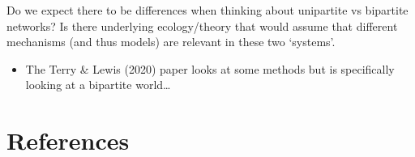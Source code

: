\documentclass[
]{article}
\providecommand{\tightlist}{%
  \setlength{\itemsep}{0pt}\setlength{\parskip}{0pt}}\usepackage{longtable,booktabs,array}
\begin{document}
Do we expect there to be differences when thinking about unipartite vs
bipartite networks? Is there underlying ecology/theory that would assume
that different mechanisms (and thus models) are relevant in these two
`systems'.

\begin{itemize}
\tightlist
\item
  The Terry \& Lewis (2020) paper looks at some methods but is
  specifically looking at a bipartite world\ldots{}
\end{itemize}

\section*{References}\label{references}
\end{document}
